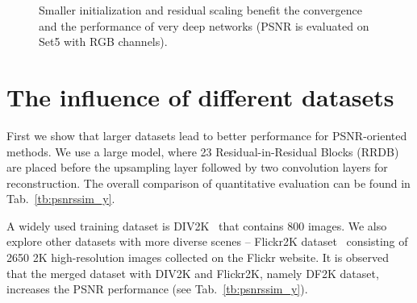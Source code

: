 \documentclass[runningheads]{llncs}
\begin{document}
\begin{figure}[htbp]%
	\vspace{-0.4cm}
	\centering
	\qquad
	\caption{Smaller initialization and residual scaling benefit the convergence and the performance of very deep 
		networks (PSNR is evaluated on Set5 with RGB channels).}%
	\label{fig:deeper_net}%
	\vspace{-0.4cm}
\end{figure}

\section{The influence of different datasets} \label{sec:influence_datasets}

First we show that larger datasets lead to better performance for PSNR-oriented methods.
%
We use a large model, where 23 Residual-in-Residual Blocks (RRDB) are placed before 
the upsampling layer followed by two convolution layers for reconstruction.
%
The overall comparison of quantitative evaluation can be found in Tab.~\ref{tb:psnrssim_y}.

A widely used training dataset is DIV2K~\cite{agustsson2017ntire} that contains 800 images.
We also explore other datasets with more diverse scenes -- Flickr2K dataset~\cite{timofte2017ntire} consisting of 
2650 2K high-resolution images collected on the Flickr website.
%
It is observed that the merged dataset with DIV2K and Flickr2K, namely DF2K dataset, increases the PSNR performance  
 (see Tab.~\ref{tb:psnrssim_y}).
\end{document}
